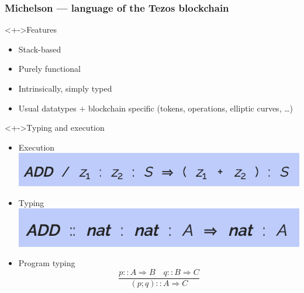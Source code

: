\documentclass[aspectratio=1610]{beamer}
\begin{document}
\begin{frame}
  \frametitle{Michelson --- language of the Tezos blockchain}
  \begin{block}<+->{Features}
  \begin{itemize}
  \item Stack-based
  \item Purely functional
  \item Intrinsically, simply typed
  \item Usual datatypes $+$ blockchain specific (tokens, operations, elliptic curves, \dots)
  \end{itemize}
\end{block}
\begin{exampleblock}<+->{Typing and execution}
  \begin{itemize}
  \item Execution \hspace{1ex}\includegraphics[scale=0.65]{add-semantics}
  \item Typing\qquad \includegraphics[scale=0.65]{add-typing}
  \item Program typing
    \begin{displaymath}
      \frac{p :: A \Rightarrow B \quad q :: B \Rightarrow C}{(p;q) :: A \Rightarrow C}
    \end{displaymath}
  \end{itemize}
\end{exampleblock}
\end{frame}
\end{document}
